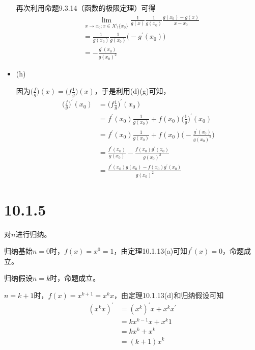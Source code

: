\documentclass{article}
\begin{document}
\begin{itemize}
        再次利用命题9.3.14（函数的极限定理）可得
        \begin{align*}
           & \lim\limits_{x \to x_0; x \in X \setminus \{x_0\}} \frac{1}{g(x)} \frac{1}{g(x_0)} \frac{g(x_0) - g(x)}{x - x_0} \\
           & = \frac{1}{g(x_0)} \frac{1}{g(x_0)} \big( - g^\prime(x_0)\big)                                                   \\
           & = -\frac{g^\prime(x_0)}{g(x_0)^{2}}
        \end{align*}

  \item (h)

        因为$\big(\frac{f}{g}\big)(x) = \big(f\frac{1}{g}\big)(x)$，于是利用(d)(g)可知，
        \begin{align*}
          \big(\frac{f}{g}\big)^\prime(x_0) & = \big(f\frac{1}{g}\big)^\prime(x_0)                                                 \\
                                            & = f^\prime(x_0)\frac{1}{g(x_0)} + f(x_0)\big(\frac{1}{g}\big)^\prime(x_0)            \\
                                            & = f^\prime(x_0)\frac{1}{g(x_0)} + f(x_0) \big(-\frac{g^\prime(x_0)}{g(x_0)^{2}}\big) \\
                                            & = \frac{f^\prime(x_0)}{g(x_0)} - \frac{f(x_0) g^\prime(x_0)}{g(x_0)^{2}}             \\
                                            & = \frac{f^\prime(x_0) g(x_0) - f(x_0) g^\prime(x_0)}{g(x_0)^{2}}
        \end{align*}


\end{itemize}

\section*{10.1.5}

对$n$进行归纳。

归纳基始$n = 0$时，$f(x) = x^0 = 1$，由定理10.1.13(a)可知$f^\prime(x) = 0$，命题成立。

归纳假设$n = k$时，命题成立。

$n = k+1$时，$f(x) = x^{k + 1} = x^k x$，由定理10.1.13(d)和归纳假设可知
\begin{align*}
  (x^k x)^\prime
   & = (x^k)^\prime x + x^k x^\prime \\
   & = kx^{k-1} x + x^k 1            \\
   & = kx^k + x^k                    \\
   & = (k+1)x^k
\end{align*}
\end{document}

